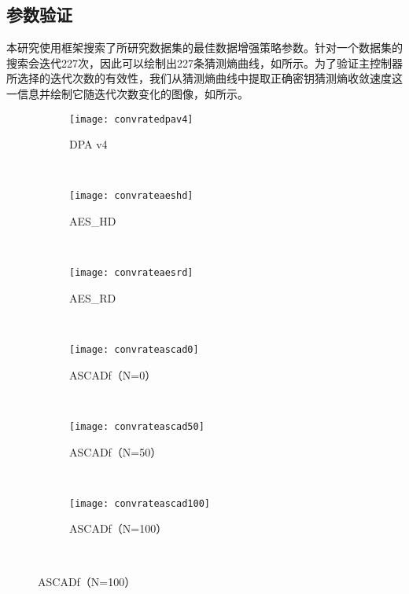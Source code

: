 {	\subsection{参数验证}
	本研究使用框架搜索了所研究数据集的最佳数据增强策略参数。针对一个数据集的搜索会迭代227次，因此可以绘制出227条猜测熵曲线，如所示。为了验证主控制器所选择的迭代次数的有效性，我们从猜测熵曲线中提取正确密钥猜测熵收敛速度这一信息并绘制它随迭代次数变化的图像，如所示。
	\begin{figure}[!htbp]
		\centering
		\begin{subfigure}[b]{\trif\textwidth}
			\texttt{[image: convratedpav4]}
			\caption{DPA v4}
			\label{fig:convratedpav4}
		\end{subfigure}%
		~%
		\begin{subfigure}[b]{\trif\textwidth}
			\texttt{[image: convrateaeshd]}
			\caption{AES\_HD}
			\label{fig:convrateaeshd}
		\end{subfigure}
		~%
		\begin{subfigure}[b]{\trif\textwidth}
			\texttt{[image: convrateaesrd]}
			\caption{AES\_RD}
			\label{fig:convrateaesrd}
		\end{subfigure}
		\\%
		\begin{subfigure}[b]{\trif\textwidth}
			\texttt{[image: convrateascad0]}
			\caption{ASCADf（N=0）}
			\label{fig:convrateascad0}
		\end{subfigure}%
		~%
		\begin{subfigure}[b]{\trif\textwidth}
			\texttt{[image: convrateascad50]}
			\caption{ASCADf（N=50）}
			\label{fig:convrateascad50}
		\end{subfigure}
		~%
		\begin{subfigure}[b]{\trif\textwidth}
			\texttt{[image: convrateascad100]}
			\caption{ASCADf（N=100）}
			\label{fig:convrateascad100}
		\end{subfigure}
		\\%
		\label{fig:convrateit}
	\end{figure}
	
}
